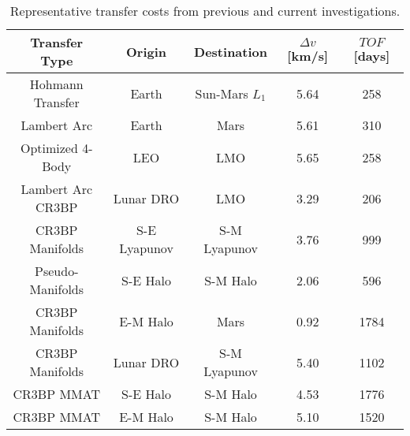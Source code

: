 \begin{table}[H]
    \centering
    \caption{Representative transfer costs from previous and current investigations.}
    \begin{tabular}{|c|c|c|c|c|}
        \hline
        \textbf{Transfer Type}                      &   \textbf{Origin} &   \textbf{Destination}    &   \boldmath$\Delta v$ \textbf{[km/s]} &   \boldmath$TOF$ \textbf{[days]}  \\  \hline
        Hohmann Transfer                            &   Earth           &   Sun-Mars $L_{1}$        &   5.64                                &   258                             \\  \hline
        Lambert Arc\cite{Eagle:2022}                &   Earth           &   Mars                    &   5.61                                &   310                             \\  \hline
        Optimized 4-Body\cite{Miele:1999}           &   LEO             &   LMO                     &   5.65                                &   258                             \\  \hline
        Lambert Arc CR3BP\cite{Conte:2017}          &   Lunar DRO       &   LMO                     &   3.29                                &   206                             \\  \hline
        CR3BP Manifolds\cite{Topputo:2005}          &   S-E Lyapunov    &   S-M Lyapunov            &   3.76                                &   999                             \\  \hline
        Pseudo-Manifolds\cite{Haibin:2014}          &   S-E Halo        &   S-M Halo                &   2.06                                &   596                             \\  \hline
        CR3BP Manifolds\cite{Kakoi:2014}            &   E-M Halo        &   Mars                    &   0.92                                &   1784                            \\  \hline
        CR3BP Manifolds\cite{Cavallari:2019}        &   Lunar DRO       &   S-M Lyapunov            &   5.40                                &   1102                            \\  \hline
        CR3BP MMAT\cite{Canales:2022}               &   S-E Halo        &   S-M Halo                &   4.53                                &   1776                            \\  \hline
        CR3BP MMAT                                  &   E-M Halo        &   S-M Halo                &   5.10                                &   1520                            \\  \hline
    \end{tabular}
    \label{tab:transferCosts}
\end{table}

